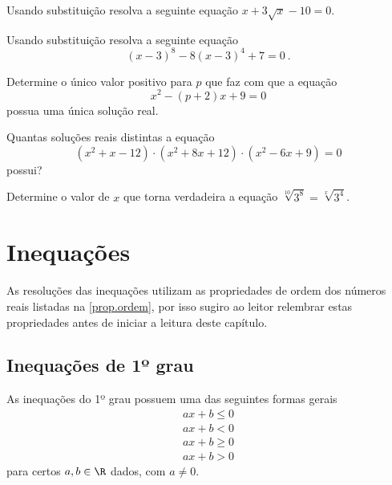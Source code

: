 \begin{exer}
Usando substituição resolva a seguinte equação $x + 3\sqrt{x} - 10=0$.
\end{exer}
\begin{resp}
  \construirResp
\end{resp}

\begin{exer}
Usando substituição resolva a seguinte equação \[(x-3)^8 - 8(x-3)^4 + 7=0 \ . \]
\end{exer}
\begin{resp}
  \construirResp
\end{resp}

\begin{exer}
Determine o único valor positivo para $p$ que faz com que a equação 
\[x^2 - (p+2)x + 9= 0\]
possua uma única solução real.
\end{exer}
\begin{resp}
  \construirResp
\end{resp}

\begin{exer}
Quantas soluções reais distintas a equação
\[(x^2 + x - 12)\cdot (x^2 + 8x + 12) \cdot (x^2 - 6x + 9)= 0\]
possui?
\end{exer}
\begin{resp}
  \construirResp
\end{resp}

\begin{exer}
Determine o valor de $x$ que torna verdadeira a equação $\sqrt[10]{3^8}= \sqrt[x]{3^4}$.
\end{exer}
\begin{resp}
  \construirResp
\end{resp}


\chapter{Inequações}

 As resoluções das inequações utilizam as propriedades de ordem dos números reais listadas na \autoref{prop.ordem}, por isso sugiro ao leitor relembrar estas propriedades antes de iniciar a leitura deste capítulo.

 \section{Inequações de 1º grau}
 
 \vskip0.3cm
 \colorbox{azul}{
 \begin{minipage}{0.9\linewidth}
 \begin{center}
  As inequações do 1º grau possuem uma das seguintes formas gerais
 \begin{eqnarray*}
 ax+b \leq 0 \\
 ax+b < 0 \\
 ax+b \geq 0 \\
 ax+b >0 
 \end{eqnarray*}  
 para certos $a, b \in \R$ dados, com $a \neq 0$.
 \end{center}
 \end{minipage}}
 \vskip0.3cm
  
